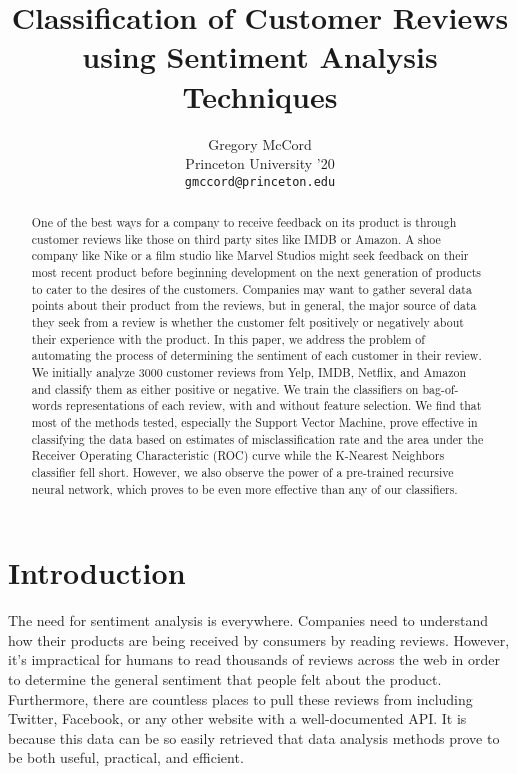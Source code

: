 \documentclass{article} %
\title{Classification of Customer Reviews using Sentiment Analysis Techniques}
\author{
Gregory McCord\\
Princeton University '20\\
\texttt{gmccord@princeton.edu} \\
}
\begin{document}
\maketitle

\begin{abstract}

One of the best ways for a company to receive feedback on its product is through customer reviews like those on third party sites like IMDB or Amazon. A shoe company like Nike or a film studio like Marvel Studios might seek feedback on their most recent product before beginning development on the next generation of products to cater to the desires of the customers. Companies may want to gather several data points about their product from the reviews, but in general, the major source of data they seek from a review is whether the customer felt positively or negatively about their experience with the product. In this paper, we address the problem of automating the process of determining the sentiment of each customer in their review. We initially analyze 3000 customer reviews from Yelp, IMDB, Netflix, and Amazon and classify them as either positive or negative. We train the classifiers on bag-of-words representations of each review, with and without feature selection. We find that most of the methods tested, especially the Support Vector Machine, prove effective in classifying the data based on estimates of misclassification rate and the area under the Receiver Operating Characteristic (ROC) curve while the K-Nearest Neighbors classifier fell short. However, we also observe the power of a pre-trained recursive neural network, which proves to be even more effective than any of our classifiers.

\end{abstract}

\section{Introduction}

The need for sentiment analysis is everywhere. Companies need to understand how their products are being received by consumers by reading reviews. However, it's impractical for humans to read thousands of reviews across the web in order to determine the general sentiment that people felt about the product. Furthermore, there are countless places to pull these reviews from including Twitter, Facebook, or any other website with a well-documented API. It is because this data can be so easily retrieved that data analysis methods prove to be both useful, practical, and efficient.
\end{document}
